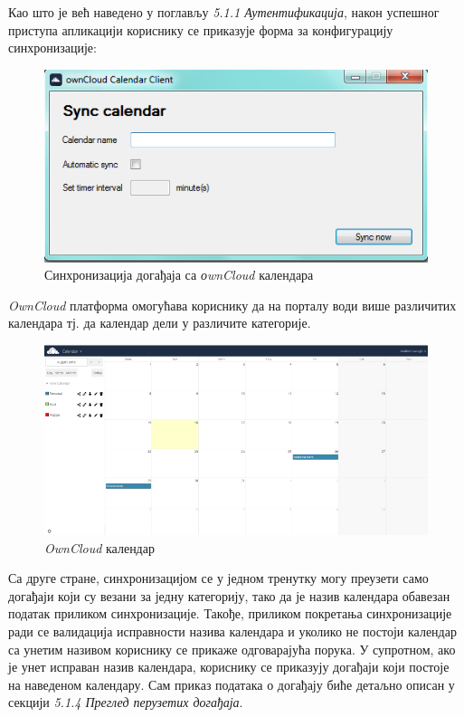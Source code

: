 Као што је већ наведено у поглављу \textit{5.1.1 Аутентификација}, након успешног приступа апликацији кориснику се приказује форма за конфигурацију синхронизације:

\begin{figure}[H]
	\centering
	\includegraphics[scale=0.5]{slike/SyncCalendar.png}
	\caption{Синхронизација догађаја са \textit{оwnCloud} календара}
	\label{fig:sync_calendar}
\end{figure}


\textit{OwnCloud} платформа омогућава кориснику да на порталу води више различитих календара тј. да календар дели у различите категорије. 

\begin{figure}[H]
	\centering
	\includegraphics[scale=0.5]{slike/ownCloudCalendar.png}
	\caption{\textit{OwnCloud} календар}
	\label{fig:own_cloud_calendar}
\end{figure}


Са друге стране, синхронизацијом се у једном тренутку могу преузети само догађаји који су везани за једну категорију, тако да је назив календара обавезан податак приликом синхронизације. Такође, приликом покретања синхронизације ради се валидација исправности назива календара и уколико не постоји календар са унетим називом кориснику се прикаже одговарајућа порука. У супротном, ако је унет исправан назив календара, кориснику се приказују догађаји који постоје на наведеном календару. Сам приказ података о догађају биће детаљно описан у секцији \textit{5.1.4 Преглед перузетих догађаја}.

